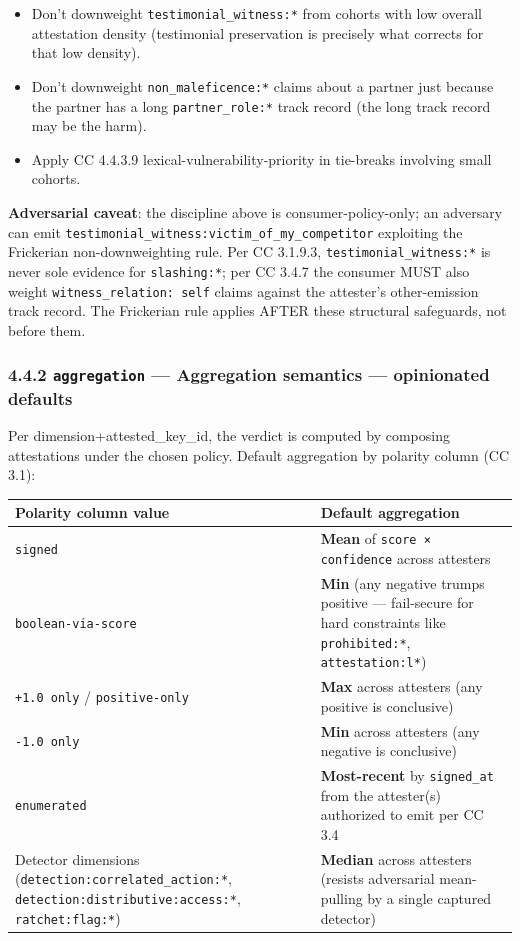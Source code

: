 \documentclass[11pt]{article}
\begin{document}
\begin{itemize}\setlength\itemsep{0pt}
\item Don't downweight \texttt{testimonial\_witness:*} from cohorts with low overall attestation density (testimonial preservation is precisely what corrects for that low density).
\item Don't downweight \texttt{non\_maleficence:*} claims about a partner just because the partner has a long \texttt{partner\_role:*} track record (the long track record may be the harm).
\item Apply CC 4.4.3.9 lexical-vulnerability-priority in tie-breaks involving small cohorts.
\end{itemize}


\textbf{Adversarial caveat}: the discipline above is consumer-policy-only; an adversary can emit \texttt{testimonial\_witness:victim\_of\_my\_competitor} exploiting the Frickerian non-downweighting rule. Per CC 3.1.9.3, \texttt{testimonial\_witness:*} is never sole evidence for \texttt{slashing:*}; per CC 3.4.7 the consumer MUST also weight \texttt{witness\_relation: self} claims against the attester's other-emission track record. The Frickerian rule applies AFTER these structural safeguards, not before them.


\subsubsection*{4.4.2 \texttt{aggregation} — Aggregation semantics — opinionated defaults}


Per dimension+attested\_key\_id, the verdict is computed by composing attestations under the chosen policy. Default aggregation by polarity column (CC 3.1):


{\footnotesize
\begin{longtable}{|p{8.0cm}|p{8.0cm}|}\hline
\textbf{Polarity column value} & \textbf{Default aggregation} \\ \hline\endhead
\texttt{signed} & \textbf{Mean} of \texttt{score × confidence} across attesters \\ \hline
\texttt{boolean-via-score} & \textbf{Min} (any negative trumps positive — fail-secure for hard constraints like \texttt{prohibited:*}, \texttt{attestation:l*}) \\ \hline
\texttt{+1.0 only} / \texttt{positive-only} & \textbf{Max} across attesters (any positive is conclusive) \\ \hline
\texttt{-1.0 only} & \textbf{Min} across attesters (any negative is conclusive) \\ \hline
\texttt{enumerated} & \textbf{Most-recent} by \texttt{signed\_at} from the attester(s) authorized to emit per CC 3.4 \\ \hline
Detector dimensions (\texttt{detection:correlated\_action:*}, \texttt{detection:distributive:access:*}, \texttt{ratchet:flag:*}) & \textbf{Median} across attesters (resists adversarial mean-pulling by a single captured detector) \\ \hline
\end{longtable}}
\end{document}
